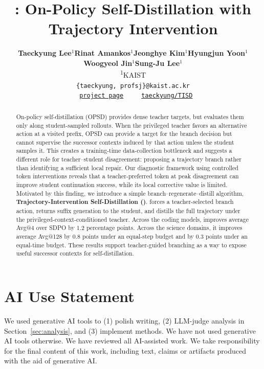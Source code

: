 \documentclass{article}
\title{\method{}: On-Policy Self-Distillation with\\Trajectory Intervention}
\author{
\begin{minipage}[t]{\textwidth}
\vspace{-0.2in}
\raggedright
\textbf{Taeckyung Lee$^1$}\hspace{0.6cm}\textbf{Rinat Amankos$^1$}\hspace{0.6cm}\textbf{Jeonghye Kim$^1$}\hspace{0.6cm}\textbf{Hyungjun Yoon$^1$}\\
\textbf{Woogyeol Jin$^1$}\hspace{0.6cm}\textbf{Sung-Ju Lee$^1$}\\[3pt]
{\normalfont
\textsuperscript{1}KAIST \\[1pt]
{\small \texttt{\{taeckyung, profsj\}@kaist.ac.kr}} \\[2pt]
\bloglogo ~ {\small \href{https://miil.kaist.ac.kr/projects/tisd/}{\texttt{project page}}}
~~
\githublogo ~ {\small \href{https://github.com/taeckyung/TISD}{\texttt{taeckyung/TISD}}}
}
\end{minipage}
}
\date{}
\theoremstyle{plain}
\newcommand{\method}{\text{TISD}}
\begin{document}
\iclrfinalcopy
\maketitle
{}
\vspace{-0.16in}

\begin{abstract}

On-policy self-distillation (OPSD) provides dense teacher targets, but evaluates them only along student-sampled rollouts. When the privileged teacher favors an alternative action at a visited prefix, OPSD can provide a target for the branch decision but cannot supervise the successor contexts induced by that action unless the student samples it. This creates a training-time data-collection bottleneck and suggests a different role for teacher--student disagreement: proposing a trajectory branch rather than identifying a sufficient local repair. Our diagnostic framework using controlled token interventions reveals that a teacher-preferred token at peak disagreement can improve student continuation success, while its local corrective value is limited. Motivated by this finding, we introduce a simple branch--regenerate--distill algorithm, \textbf{Trajectory-Intervention Self-Distillation (\method{})}. \method{} forces a teacher-selected branch action, returns suffix generation to the student, and distills the full trajectory under the privileged-context-conditioned teacher. Across the coding models, \method{} improves average Avg@4 over SDPO by 1.2 percentage points. Across the science domains, it improves average Avg@128 by 0.8 points under an equal-step budget and by 0.3 points under an equal-time budget. These results support teacher-guided branching as a way to expose useful successor contexts for self-distillation.

\end{abstract}








\section*{AI Use Statement}
We used generative AI tools to (1) polish writing, (2) LLM-judge analysis in Section~\ref{sec:analysis}, and (3) implement methods. We have not used generative AI tools otherwise. We have reviewed all AI-assisted work. We take responsibility for the final content of this work, including text, claims or artifacts produced with the aid of generative AI.
\end{document}
